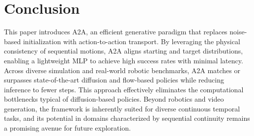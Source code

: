 \documentclass[onecolumn]{fairmeta}
\newcommand{\m}[1]{{A2A}}
\begin{document}


\section{Conclusion}
This paper introduces \m{}, an efficient generative paradigm that replaces noise-based initialization with action-to-action transport. By leveraging the physical consistency of sequential motions, \m{} aligns starting and target distributions, enabling a lightweight MLP to achieve high success rates with minimal latency. Across diverse simulation and real-world robotic benchmarks, \m{} matches or surpasses state-of-the-art diffusion and flow-based policies while reducing inference to fewer steps. This approach effectively eliminates the computational bottlenecks typical of diffusion-based policies. Beyond robotics and video generation, the framework is inherently suited for diverse continuous temporal tasks, and its potential in domains characterized by sequential continuity remains a promising avenue for future exploration.

\end{document}
